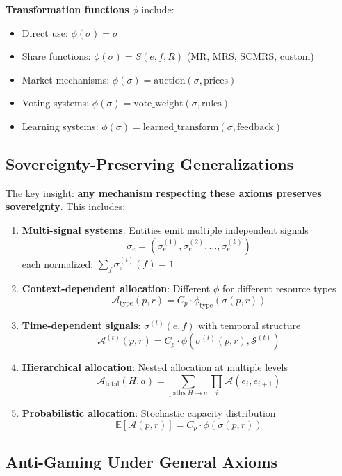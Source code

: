 \documentclass[11pt,a4paper]{article}
\theoremstyle{definition}
\theoremstyle{remark}
\begin{document}
\textbf{Transformation functions} $\phi$ include:
\begin{itemize}
\item Direct use: $\phi(\sigma) = \sigma$
\item Share functions: $\phi(\sigma) = S(e,f,R)$ (MR, MRS, SCMRS, custom)
\item Market mechanisms: $\phi(\sigma) = \text{auction}(\sigma, \text{prices})$
\item Voting systems: $\phi(\sigma) = \text{vote\_weight}(\sigma, \text{rules})$
\item Learning systems: $\phi(\sigma) = \text{learned\_transform}(\sigma, \text{feedback})$
\end{itemize}

\subsection{Sovereignty-Preserving Generalizations}

The key insight: \textbf{any mechanism respecting these axioms preserves sovereignty}. This includes:

\begin{enumerate}
\item \textbf{Multi-signal systems}: Entities emit multiple independent signals
\[ \sigma_e = (\sigma_e^{(1)}, \sigma_e^{(2)}, \ldots, \sigma_e^{(k)}) \]
each normalized: $\sum_f \sigma_e^{(i)}(f) = 1$

\item \textbf{Context-dependent allocation}: Different $\phi$ for different resource types
\[ \mathcal{A}_{\text{type}}(p,r) = C_p \cdot \phi_{\text{type}}(\sigma(p,r)) \]

\item \textbf{Time-dependent signals}: $\sigma^{(t)}(e,f)$ with temporal structure
\[ \mathcal{A}^{(t)}(p,r) = C_p \cdot \phi(\sigma^{(t)}(p,r), \mathcal{S}^{(t)}) \]

\item \textbf{Hierarchical allocation}: Nested allocation at multiple levels
\[ \mathcal{A}_{\text{total}}(H,a) = \sum_{\text{paths } H \to a} \prod_{i} \mathcal{A}(e_i, e_{i+1}) \]

\item \textbf{Probabilistic allocation}: Stochastic capacity distribution
\[ \mathbb{E}[\mathcal{A}(p,r)] = C_p \cdot \phi(\sigma(p,r)) \]
\end{enumerate}

\subsection{Anti-Gaming Under General Axioms}
\end{document}
